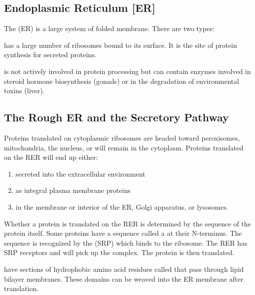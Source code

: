 \documentclass[../Bio_chemistryReview.tex]{subfiles}
\begin{document}
\subsection{Endoplasmic Reticulum [ER]}
The  (ER) is a large system of folded membrane.
There are two types:
\begin{description}
  \item {} has a large number of ribosomes
    bound to its surface. It is the site of protein synthesis for secreted
    proteins.
  \item {} is not actively involved in
    protein processing but can contain enzymes involved in steroid hormone
    biosynthesis (gonads) or in the degradation of environmental toxins (liver).
\end{description}

\subsection{The Rough ER and the Secretory Pathway}
Proteins translated on cytoplasmic ribosomes are headed toward peroxisomes,
mitochondria, the nucleus, or will remain in the cytoplasm. Proteins translated
on the RER will end up either:
\begin{enumerate}
  \item secreted into the extracellular environment
  \item as integral plasma membrane proteins
  \item in the membrane or interior of the ER, Golgi apparatus, or lysosomes.
\end{enumerate}

Whether a protein is translated on the RER is determined by the sequence of the
protein itself. Some proteins have a sequence called a 
at their N-terminus. The sequence is recognized by the  (SRP) which binds to the ribosome. The RER has SRP
receptors and will pick up the complex. The protein is then translated.\par

 have sections of hydrophobic amino acid
residues called  that pass through lipid bilayer
membranes. These domains can be weaved into the ER membrane after
translation.\par
\end{document}
